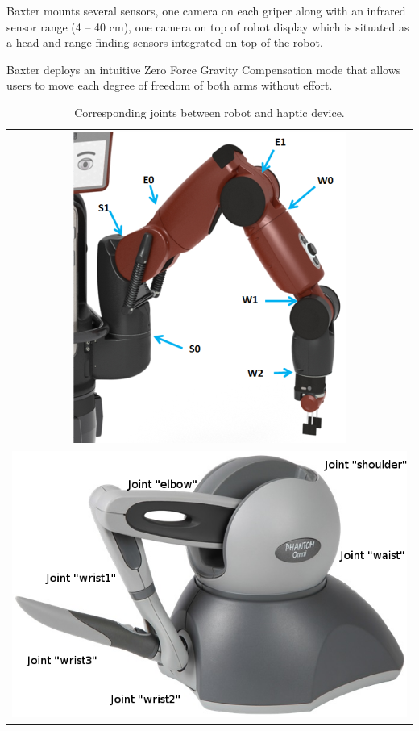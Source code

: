 \documentclass[journal,twoside]{JoPhA}
\begin{document}
Baxter mounts several sensors, one camera on each griper along with an infrared sensor range (4 – 40 cm), one camera on top of robot display which is situated as a head and range finding  sensors integrated on top of the robot.

Baxter deploys an  intuitive  Zero  Force  Gravity Compensation  mode that  allows  users  to move  each  degree of freedom of both arms without effort.


%
%

\begin{table}
\centering
\begin{tabular}{c}
\includegraphics[scale=1.2]{Images/joint_baxter.png} \\
\includegraphics[scale=0.4]{Images/joint_haptico.png} 
\end{tabular}
\caption{\label{tabla_joints} Corresponding joints between robot and haptic device.}
\end{table}
\end{document}
